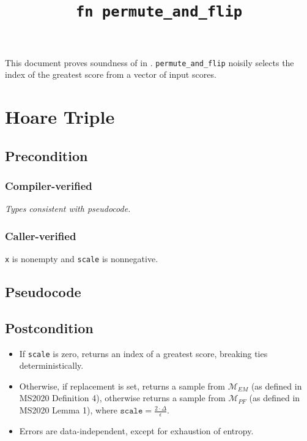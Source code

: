 \documentclass{article}
\title{\texttt{fn permute\_and\_flip}}
\author{\MichaelShoemateAuthor}
\begin{document}
\maketitle\contrib
This document proves soundness of  \cite{mckenna2020permute} in .
\texttt{permute\_and\_flip} noisily selects the index of the greatest score from a vector of input scores.

\section{Hoare Triple}
\subsection*{Precondition}
\subsubsection*{Compiler-verified}
\textit{Types consistent with pseudocode.}

\subsubsection*{Caller-verified}
\texttt{x} is nonempty and \texttt{scale} is nonnegative.

\subsection*{Pseudocode}
\label{sec:python-pseudocode}


\subsection*{Postcondition}
\begin{theorem}
    \label{postcondition}
    \begin{itemize}
        \item If \texttt{scale} is zero, returns an index of a greatest score, breaking ties deterministically.
        \item Otherwise, if replacement is set, returns a sample from $\mathcal{M}_{EM}$ (as defined in MS2020 Definition 4),
            otherwise returns a sample from $\mathcal{M}_{PF}$ (as defined in MS2020 Lemma 1),
            where $\texttt{scale} = \frac{2 \cdot \Delta}{\epsilon}$.
        \item Errors are data-independent, except for exhaustion of entropy.
    \end{itemize}
\end{theorem}
\end{document}
